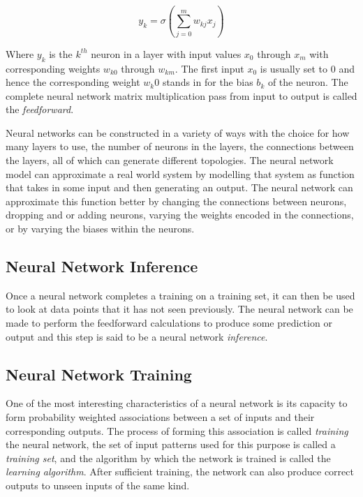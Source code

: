 \begin{equation}
	y_k = \sigma \left( \sum_{j=0}^m w_{kj} x_j \right)
\end{equation}

Where $y_k$ is the $k^{th}$ neuron in a layer with input values $x_0$ through $x_m$ with corresponding weights $w_{k0}$ through $w_{km}$. The first input $x_0$ is usually set to $0$ and hence the corresponding weight $w_k0$ stands in for the bias $b_k$ of the neuron. The complete neural network matrix multiplication pass from input to output is called the \textit{feedforward}.

Neural networks can be constructed in a variety of ways with the choice for how many layers to use, the number of neurons in the layers, the connections between the layers, all of which can generate different topologies. The neural network model can approximate a real world system by modelling that system as function that takes in some input and then generating an output. The neural network can approximate this function better by changing the connections between neurons, dropping and or adding neurons, varying the weights encoded in the connections, or by varying the biases within the neurons.

\subsection{Neural Network Inference}

Once a neural network completes a training on a training set, it can then be used to look at data points that it has not seen previously. The neural network can be made to perform the feedforward calculations to produce some prediction or output and this step is said to be a neural network \textit{inference}.

\subsection{Neural Network Training}

One of the most interesting characteristics of a neural network is its capacity to form probability weighted associations between a set of inputs and their corresponding outputs. The process of forming this association is called \textit{training} the neural network, the set of input patterns used for this purpose is called a \textit{training set}, and the algorithm by which the network is trained is called the \textit{learning algorithm}. After sufficient training, the network can also produce correct outputs to unseen inputs of the same kind.

